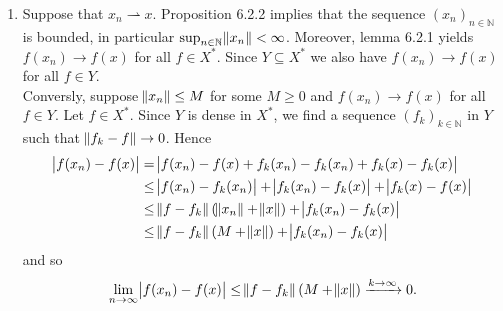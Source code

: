 \begin{enumerate}[label = \textbf{Exercise \arabic*.},wide = 0pt, itemsep = 1.5ex]
\begin{enumerate}[label = \textbf{\alph*.},wide = 0pt, itemsep = 1.5ex]
\begin{proof}
					Let $U \in \mathcal{T}$. Then $U = \cup_{\alpha \in A}B_\alpha$ for some index set $A$ and $B_\alpha \in \mathcal{B}$ for all $\alpha \in A$. But each $B_\alpha$ is a finite intersection of elements of $\mathcal{\altS}$ and thus since $\mathcal{T}_\mathcal{F}$ is a topology containing $\mathcal{\altS}$, we have that $B_\alpha \in \mathcal{T}_\mathcal{F}$ for all $\alpha \in A$. But then also $U \in \mathcal{T}_\mathcal{F}$ as a union of sets in $\mathcal{T}_\mathcal{F}$. Hence $\mathcal{T} \subseteq \mathcal{T}_\mathcal{F}$. 
				\end{proof}
		\end{enumerate}
	\item Suppose that $x_n \rightharpoonup x$. Proposition 6.2.2 implies that the sequence $(x_n)_{n \in \mathbb{N}}$ is bounded, in particular $\sup_{n \in \mathbb{N}} \norm{x_n} < \infty$. Moreover, lemma 6.2.1 yields $f(x_n) \to f(x)$ for all $f \in X^*$. Since $Y \subseteq X^*$ we also have $f(x_n) \to f(x)$ for all $f \in Y$.\\
		Conversly, suppose $\norm{x_n} \leq M$ for some $M \geq 0$ and $f(x_n) \to f(x)$ for all $f \in Y$. Let $f \in X^*$. Since $Y$ is dense in $X^*$, we find a sequence $(f_k)_{k \in \mathbb{N}}$ in $Y$ such that $\norm{f_k - f} \to 0$. Hence
		\begin{align*}
			\abs{f(x_n) - f(x)} &= \abs{f(x_n) - f(x) + f_k(x_n) - f_k(x_n) + f_k(x) - f_k(x)}\\
			&\leq \abs{f(x_n) - f_k(x_n)} + \abs{f_k(x_n) - f_k(x)} + \abs{f_k(x) - f(x)}\\
			&\leq \norm{f - f_k}\del[0]{\norm{x_n} + \norm{x}} + \abs{f_k(x_n) - f_k(x)}\\
			&\leq \norm{f - f_k}\del[0]{M + \norm{x}} + \abs{f_k(x_n) - f_k(x)}\\
		\end{align*}
		\noindent and so
		\begin{equation*}
			\lim_{n \to \infty} \abs{f(x_n) - f(x)} \leq \norm{f - f_k}\del[0]{M + \norm{x}} \xrightarrow{k \to \infty} 0.
		\end{equation*}
\end{enumerate}
\printbibliography

